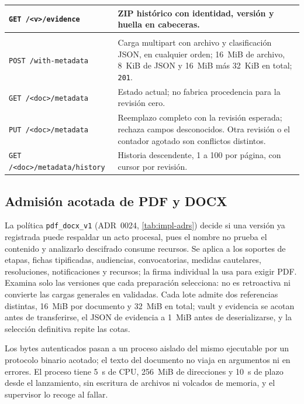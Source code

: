 \begin{table}[!t]
\begin{tabularx}{\linewidth}{@{}>{\raggedright\arraybackslash}p{4.3cm} >{\raggedright\arraybackslash}X@{}}
    \texttt{GET /<v>/evidence} & ZIP histórico con identidad, versión y huella en cabeceras. \\
    \midrule
    \multicolumn{2}{@{}l}{\textit{Clasificación} (\cref{sec:impl-http-clasificacion})} \\
    \texttt{POST /with-metadata} & Carga multipart con archivo y clasificación JSON, en cualquier orden; 16~MiB de archivo, 8~KiB de JSON y 16~MiB más 32~KiB en total; \texttt{201}. \\
    \texttt{GET /<doc>/metadata} & Estado actual; no fabrica procedencia para la revisión cero. \\
    \texttt{PUT /<doc>/metadata} & Reemplazo completo con la revisión esperada; rechaza campos desconocidos. Otra revisión o el contador agotado son conflictos distintos. \\
    \texttt{GET /<doc>/metadata}\newline\texttt{/history} & Historia descendente, 1 a 100 por página, con cursor por revisión. \\
    \bottomrule
  \end{tabularx}
\end{table}



\subsection{Admisión acotada de PDF y DOCX}\label{sec:impl-formatos}

La política \texttt{pdf\_docx\_v1} (ADR~0024, \cref{tab:impl-adrs}) decide si una versión ya registrada puede respaldar un acto procesal, pues el nombre no prueba el contenido y analizarlo descifrado consume recursos. Se aplica a los soportes de etapas, fichas tipificadas, audiencias, convocatorias, medidas cautelares, resoluciones, notificaciones y recursos; la firma individual la usa para exigir PDF. Examina solo las versiones que cada preparación selecciona: no es retroactiva ni convierte las cargas generales en validadas. Cada lote admite dos referencias distintas, 16~MiB por documento y 32~MiB en total; vault y evidencia se acotan antes de transferirse, el JSON de evidencia a 1~MiB antes de deserializarse, y la selección definitiva repite las cotas.

Los bytes autenticados pasan a un proceso aislado del mismo ejecutable por un protocolo binario acotado; el texto del documento no viaja en argumentos ni en errores. El proceso tiene 5~s de CPU, 256~MiB de direcciones y 10~s de plazo desde el lanzamiento, sin escritura de archivos ni volcados de memoria, y el supervisor lo recoge al fallar.

